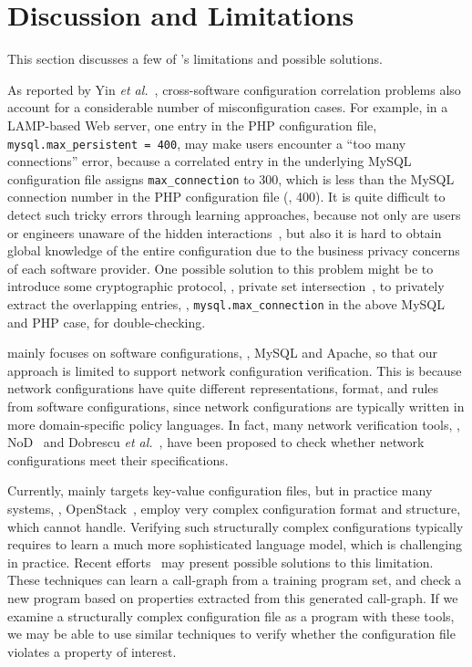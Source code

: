 
\section{Discussion and Limitations}

This section discusses a few of \app's limitations
and possible solutions.

As reported by Yin {\em et al.}~\cite{yin11anempirical},
cross-software configuration correlation problems also account
for a considerable number of misconfiguration cases.
For example, in a LAMP-based Web server, one entry in the
PHP configuration file, {\tt mysql.max\_persistent = 400},
may make users encounter a ``too many connections'' error,
because a correlated entry in the underlying MySQL configuration
file assigns {\tt max\_connection} to 300, which is less
than the MySQL connection number in the PHP configuration file (\ie, 400).
It is quite difficult to detect such tricky errors
through learning approaches, because not only are users or engineers 
unaware of the hidden interactions~\cite{xu15systems},
but also it is hard to obtain global knowledge of the entire
configuration due to the business privacy concerns of
each software provider.
One possible solution to this problem might be to introduce
some cryptographic protocol, \eg, private set
intersection~\cite{kissner05privacy}, to privately extract the
overlapping entries, \eg, {\tt mysql.max\_connection} in the 
above MySQL and PHP case, for double-checking.

\app mainly focuses on software configurations, \eg, MySQL and Apache,
so that our approach is limited to support network configuration
verification. This is because network configurations have quite
different representations, format, and rules from software configurations,
since network configurations are typically written in 
more domain-specific policy languages.
In fact, many network verification tools, 
\eg, NoD~\cite{lopes15checking} and 
Dobrescu {\em et al.}~\cite{dobrescu14software},
have been proposed to check whether network configurations
meet their specifications.

Currently, \app mainly targets key-value configuration files,
but in practice many systems, \eg, OpenStack~\cite{OpenStack},
employ very complex configuration format and structure,
which \app cannot handle.
Verifying such structurally complex configurations typically requires 
\app to learn a much more sophisticated language model,
which is challenging in practice.
Recent efforts~\cite{raychev15predicting, raychev16learning} 
may present possible solutions to this limitation.
These techniques can learn a call-graph from a training program set,
and check a new program based on properties extracted from this
generated call-graph. If we examine a structurally complex configuration 
file as a program with these tools, we may be able to use similar techniques 
to verify whether the configuration file violates a property of interest. 
